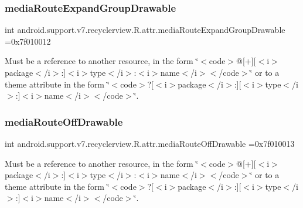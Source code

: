 \subsubsection{\texorpdfstring{media\+Route\+Expand\+Group\+Drawable}{mediaRouteExpandGroupDrawable}}
{\footnotesize\ttfamily int android.\+support.\+v7.\+recyclerview.\+R.\+attr.\+media\+Route\+Expand\+Group\+Drawable =0x7f010012\hspace{0.3cm}{\ttfamily [static]}}

Must be a reference to another resource, in the form \char`\"{}$<$code$>$@\mbox{[}+\mbox{]}\mbox{[}$<$i$>$package$<$/i$>$\+:\mbox{]}$<$i$>$type$<$/i$>$\+:$<$i$>$name$<$/i$>$$<$/code$>$\char`\"{} or to a theme attribute in the form \char`\"{}$<$code$>$?\mbox{[}$<$i$>$package$<$/i$>$\+:\mbox{]}\mbox{[}$<$i$>$type$<$/i$>$\+:\mbox{]}$<$i$>$name$<$/i$>$$<$/code$>$\char`\"{}. \mbox{\label{classandroid_1_1support_1_1v7_1_1recyclerview_1_1R_1_1attr_a4e6fb433ab766fc1f17e97b471100cc9}} 
\subsubsection{\texorpdfstring{media\+Route\+Off\+Drawable}{mediaRouteOffDrawable}}
{\footnotesize\ttfamily int android.\+support.\+v7.\+recyclerview.\+R.\+attr.\+media\+Route\+Off\+Drawable =0x7f010013\hspace{0.3cm}{\ttfamily [static]}}

Must be a reference to another resource, in the form \char`\"{}$<$code$>$@\mbox{[}+\mbox{]}\mbox{[}$<$i$>$package$<$/i$>$\+:\mbox{]}$<$i$>$type$<$/i$>$\+:$<$i$>$name$<$/i$>$$<$/code$>$\char`\"{} or to a theme attribute in the form \char`\"{}$<$code$>$?\mbox{[}$<$i$>$package$<$/i$>$\+:\mbox{]}\mbox{[}$<$i$>$type$<$/i$>$\+:\mbox{]}$<$i$>$name$<$/i$>$$<$/code$>$\char`\"{}. \mbox{\label{classandroid_1_1support_1_1v7_1_1recyclerview_1_1R_1_1attr_a841db7150a4c491f85f4d55844e623c8}} 
